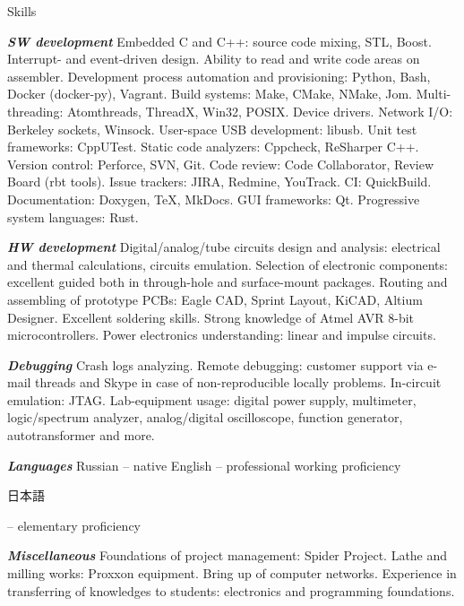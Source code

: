 \documentclass{template}
\begin{document}
\begin{rSection}{Skills}
\begin{rItemize}
\item \textbf{\textit{SW development}} \newline Embedded C and C++: source code mixing, STL, Boost. Interrupt- and event-driven design. Ability to read and write code areas on assembler. Development process automation and provisioning: Python, Bash, Docker (docker-py), Vagrant. Build systems: Make, CMake, NMake, Jom. Multi-threading: Atomthreads, ThreadX, Win32, POSIX. Device drivers. Network I/O: Berkeley sockets, Winsock. User-space USB development: libusb. Unit test frameworks: CppUTest. Static code analyzers: Cppcheck, ReSharper C++. Version control: Perforce, SVN, Git. Code review: Code Collaborator, Review Board (rbt tools). Issue trackers: JIRA, Redmine, YouTrack. CI: QuickBuild. Documentation: Doxygen, \TeX, MkDocs. GUI frameworks: Qt. Progressive system languages: Rust.
\item \textbf{\textit{HW development}} \newline Digital/analog/tube circuits design and analysis: electrical and thermal calculations, circuits emulation. Selection of electronic components: excellent guided both in through-hole and surface-mount packages. Routing and assembling of prototype PCBs: Eagle CAD, Sprint Layout, KiCAD, Altium Designer. Excellent soldering skills. Strong knowledge of Atmel AVR 8-bit microcontrollers. Power electronics understanding: linear and impulse circuits.
\item \textbf{\textit{Debugging}} \newline Crash logs analyzing. Remote debugging: customer support via e-mail threads and Skype in case of non-reproducible locally problems. In-circuit emulation: JTAG. Lab-equipment usage: digital power supply, multimeter, logic/spectrum analyzer, analog/digital oscilloscope, function generator, autotransformer and more.
\item \textbf{\textit{Languages}} \newline Russian -- native \newline English -- professional working proficiency \newline \begin{CJK}{UTF8}{min}日本語\end{CJK} -- elementary proficiency
\item \textbf{\textit{Miscellaneous}} \newline Foundations of project management: Spider Project. Lathe and milling works: Proxxon equipment. Bring up of computer networks. Experience in transferring of knowledges to students: electronics and programming foundations.
\end{rItemize}
\end{rSection}
\end{document}
